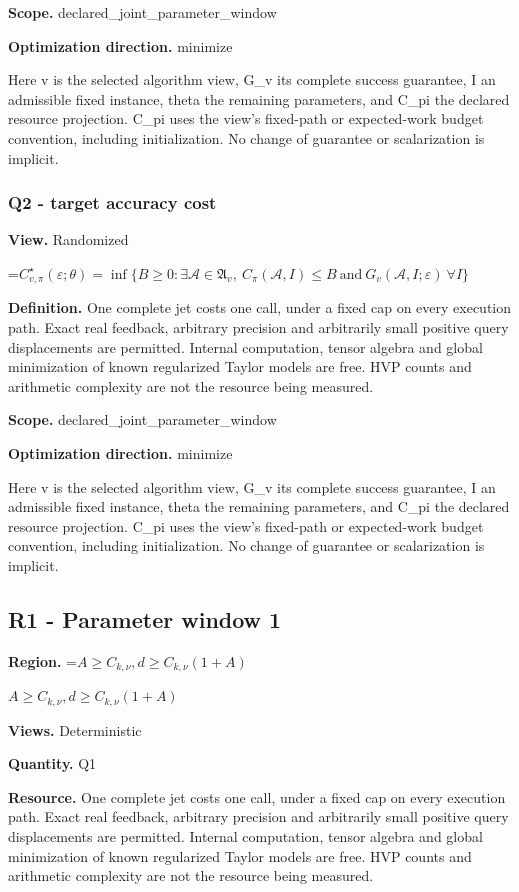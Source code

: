\documentclass[10pt,a4paper]{article}
\newcommand{\AtlasMath}[1]{\par\begingroup\centering\setbox0=\hbox{$\displaystyle #1$}\ifdim\wd0>1.4\linewidth\typeout{ATLAS WIDE FORMULA: \the\wd0}\fi\ifdim\wd0>\linewidth\resizebox{\linewidth}{!}{\box0}\else\box0\fi\par\endgroup}
\newcommand{\AtlasInlineMath}[1]{\begingroup\setbox0=\hbox{$#1$}\ifdim\wd0>.4\linewidth\endgroup\AtlasMath{#1}\else\endgroup$#1$\fi}
\begin{document}
\textbf{Scope.} declared\_joint\_parameter\_window

\textbf{Optimization direction.} minimize

Here v is the selected algorithm view, G\_v its complete success guarantee, I an admissible fixed instance, theta the remaining parameters, and C\_pi the declared resource projection. C\_pi uses the view's fixed-path or expected-work budget convention, including initialization. No change of guarantee or scalarization is implicit.

\subsubsection{Q2 - target accuracy cost}
\textbf{View.} Randomized

\AtlasMath{C^\star_{v,\pi}(\varepsilon;\theta)=\inf\{B\ge0:\exists\mathcal A\in\mathfrak A_v,\ C_\pi(\mathcal A,I)\le B\ \text{and}\ G_v(\mathcal A,I;\varepsilon)\ \forall I\}}
\textbf{Definition.} One complete jet costs one call, under a fixed cap on every execution path. Exact real feedback, arbitrary precision and arbitrarily small positive query displacements are permitted. Internal computation, tensor algebra and global minimization of known regularized Taylor models are free. HVP counts and arithmetic complexity are not the resource being measured.

\textbf{Scope.} declared\_joint\_parameter\_window

\textbf{Optimization direction.} minimize

Here v is the selected algorithm view, G\_v its complete success guarantee, I an admissible fixed instance, theta the remaining parameters, and C\_pi the declared resource projection. C\_pi uses the view's fixed-path or expected-work budget convention, including initialization. No change of guarantee or scalarization is implicit.

\subsection{R1 - Parameter window 1}
\textbf{Region.} \AtlasInlineMath{A\ge C_{k,\nu},d\ge C_{k,\nu}(1+A)}

\textbf{Views.} Deterministic

\textbf{Quantity.} Q1

\textbf{Resource.} One complete jet costs one call, under a fixed cap on every execution path. Exact real feedback, arbitrary precision and arbitrarily small positive query displacements are permitted. Internal computation, tensor algebra and global minimization of known regularized Taylor models are free. HVP counts and arithmetic complexity are not the resource being measured.
\end{document}
